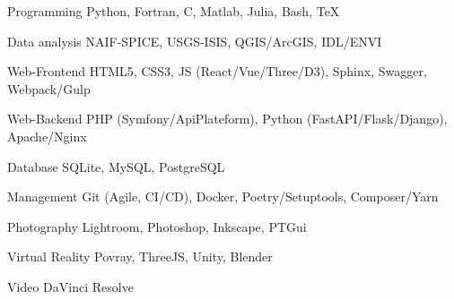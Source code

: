 
\begin{cvskills}

	\cvskill
	{Programming}
    {Python, Fortran, C, Matlab, Julia, Bash, \TeX}

	\cvskill
	{Data analysis}
    {NAIF-SPICE, USGS-ISIS, QGIS/ArcGIS, IDL/ENVI}

	\cvskill
    {Web-Frontend}
    {HTML5, CSS3, JS (React/Vue/Three/D3), Sphinx, Swagger, Webpack/Gulp}

    \cvskill
    {Web-Backend}
    {PHP (Symfony/ApiPlateform), Python (FastAPI/Flask/Django), Apache/Nginx}

	\cvskill
    {Database}
    {SQLite, MySQL, PostgreSQL}

	\cvskill
    {Management}
    {Git (Agile, CI/CD), Docker, Poetry/Setuptools, Composer/Yarn}

	\cvskill
    {Photography}
    {Lightroom, Photoshop, Inkscape, PTGui}

    \cvskill
    {Virtual Reality}
    {Povray, ThreeJS, Unity, Blender}

    \cvskill
    {Video}
    {DaVinci Resolve}

\end{cvskills}
